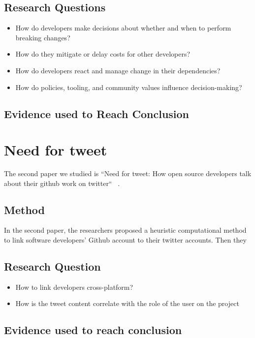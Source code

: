 \documentclass[conference]{IEEEtran}
\begin{document}
\subsection{Research Questions}

\begin{itemize}
    \item How do developers make decisions about whether and when to perform breaking changes?
    \item How do they mitigate or delay costs for other developers?
    \item How do developers react and manage change in their dependencies?
    \item How do policies, tooling, and community values influence decision-making?
\end{itemize}

\subsection{Evidence used to Reach Conclusion}


\section{Need for tweet}

The second paper we studied is ``Need for tweet: How open source developers talk about their github work on twitter``~\cite{fang2020need} .

\subsection{Method}
In the second paper, the researchers proposed a heuristic computational method to link software developers' Github account to their twitter accounts.
Then they 
\subsection{Research Question}
\begin{itemize}
    \item How to link developers cross-platform?
    \item How is the tweet content correlate with the role of the user on the project 
\end{itemize}
\subsection{Evidence used to reach conclusion}
\end{document}
